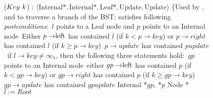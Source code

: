 \begin{figure*}
\begin{code}
\firstline
{}($Key\ k$) : $\langle \mbox{Internal*}, \mbox{Internal*}, \mbox{Leaf*}, \mbox{Update}, \mbox{Update}\rangle$  \{\ul
\n \com Used by ,  and  to traverse a branch of the BST; satisfies following {\it postconditions}:\ul
   \com \postnotnull\ $l$ points to a Leaf node and $p$ points to an Internal node\ul
      \com \postl\ Either $p\rightarrow \lft$ has contained $l$ (if $k<p\rightarrow key$) or $p\rightarrow right$ has contained $l$ (if $k\geq p\rightarrow key$)\ul
      \com \postpup\ $p\rightarrow update$ has contained $pupdate$\ul
      \com \postnonempty\ if $l\rightarrow key\neq \infty_1$, then the following three statements hold:\ul
      \com \hspace*{3mm}\postgpnotnull\ $gp$ points to an Internal node\ul
      \com \hspace*{3mm}\postp\ either $gp\rightarrow \lft$ has contained $p$ (if $k<gp\rightarrow key$) or $gp\rightarrow right$ has contained $p$ (if $k\geq gp\rightarrow key$)\ul
       \com \hspace*{3mm}\postgpup\ $gp\rightarrow update$ has contained $gpupdate$\nl
       Internal *$gp$, *$p$\nl
       Node *$l:= Root$  \label{restart-search}\nl


\end{code}
\end{figure*}
